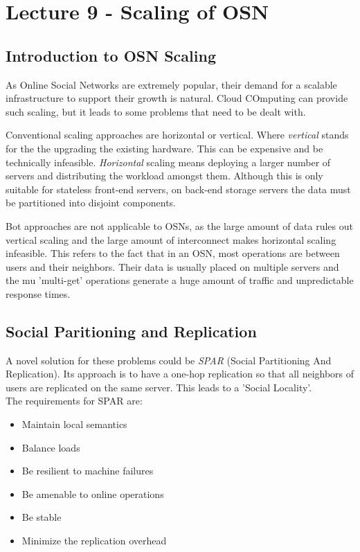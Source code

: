 \section{Lecture 9 - Scaling of OSN} %
\label{sec:lecture_9_scaling_of_osn}

\subsection{Introduction to OSN Scaling}
As Online Social Networks are extremely popular,
their demand for a scalable infrastructure to support their growth is natural.
Cloud COmputing can provide such scaling,
but it leads to some problems that need to be dealt with.

Conventional scaling approaches are horizontal or vertical.
Where \emph{vertical} stands for the the upgrading the existing hardware.
This can be expensive and be technically infeasible.
\emph{Horizontal} scaling means deploying a larger number of servers
and distributing the workload amongst them.
Although this is only suitable for stateless front-end servers,
on back-end storage servers the data must be partitioned into disjoint components.

Bot approaches are not applicable to OSNs,
as the large amount of data rules out vertical scaling 
and the large amount of interconnect makes horizontal scaling infeasible.
This refers to the fact that in an OSN,
most operations are between users and their neighbors.
Their data is usually placed on multiple servers
and the mu 'multi-get' operations generate a huge amount of traffic
and unpredictable response times.

\subsection{Social Paritioning and Replication} %
\label{sub:social_paritioning_and_replication}
A novel solution for these problems could be \emph{SPAR} (Social Partitioning And Replication).
Its approach is to have a one-hop replication
so that all neighbors of users are replicated on the same server.
This leads to a 'Social Locality'.\\
The requirements for SPAR are:
	\begin{itemize}
		\item Maintain local semantics
		\item Balance loads
		\item Be resilient to machine failures
		\item Be amenable to online operations
		\item Be stable
		\item Minimize the replication overhead
	\end{itemize}

